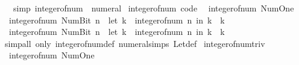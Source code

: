 \begin{isabellebody}
\ \ \ {\isacharbrackleft}{\kern0pt}simp{\isacharbrackright}{\kern0pt}{\isacharcolon}{\kern0pt}\ {\isachardoublequoteopen}integer{\isacharunderscore}{\kern0pt}of{\isacharunderscore}{\kern0pt}num\ {\isacharequal}{\kern0pt}\ numeral{\isachardoublequoteclose}\isanewline
\isanewline
{}\isamarkupfalse%
\ integer{\isacharunderscore}{\kern0pt}of{\isacharunderscore}{\kern0pt}num\ {\isacharbrackleft}{\kern0pt}code{\isacharbrackright}{\kern0pt}{\isacharcolon}{\kern0pt}\isanewline
\ \ {\isachardoublequoteopen}integer{\isacharunderscore}{\kern0pt}of{\isacharunderscore}{\kern0pt}num\ Num{\isachardot}{\kern0pt}One\ {\isacharequal}{\kern0pt}\ {}{\isachardoublequoteclose}\isanewline
\ \ {\isachardoublequoteopen}integer{\isacharunderscore}{\kern0pt}of{\isacharunderscore}{\kern0pt}num\ {\isacharparenleft}{\kern0pt}Num{\isachardot}{\kern0pt}Bit{}\ n{\isacharparenright}{\kern0pt}\ {\isacharequal}{\kern0pt}\ {\isacharparenleft}{\kern0pt}let\ k\ {\isacharequal}{\kern0pt}\ integer{\isacharunderscore}{\kern0pt}of{\isacharunderscore}{\kern0pt}num\ n\ in\ k\ {\isacharplus}{\kern0pt}\ k{\isacharparenright}{\kern0pt}{\isachardoublequoteclose}\isanewline
\ \ {\isachardoublequoteopen}integer{\isacharunderscore}{\kern0pt}of{\isacharunderscore}{\kern0pt}num\ {\isacharparenleft}{\kern0pt}Num{\isachardot}{\kern0pt}Bit{}\ n{\isacharparenright}{\kern0pt}\ {\isacharequal}{\kern0pt}\ {\isacharparenleft}{\kern0pt}let\ k\ {\isacharequal}{\kern0pt}\ integer{\isacharunderscore}{\kern0pt}of{\isacharunderscore}{\kern0pt}num\ n\ in\ k\ {\isacharplus}{\kern0pt}\ k\ {\isacharplus}{\kern0pt}\ {}{\isacharparenright}{\kern0pt}{\isachardoublequoteclose}\isanewline
%
\isadelimproof
\ \ %
\endisadelimproof
%
\isatagproof
{}\isamarkupfalse%
\ {\isacharparenleft}{\kern0pt}simp{\isacharunderscore}{\kern0pt}all\ only{\isacharcolon}{\kern0pt}\ integer{\isacharunderscore}{\kern0pt}of{\isacharunderscore}{\kern0pt}num{\isacharunderscore}{\kern0pt}def\ numeral{\isachardot}{\kern0pt}simps\ Let{\isacharunderscore}{\kern0pt}def{\isacharparenright}{\kern0pt}%
\endisatagproof
{\isafoldproof}%
%
\isadelimproof
\isanewline
%
\endisadelimproof
\isanewline
{}\isamarkupfalse%
\ integer{\isacharunderscore}{\kern0pt}of{\isacharunderscore}{\kern0pt}num{\isacharunderscore}{\kern0pt}triv{\isacharcolon}{\kern0pt}\isanewline
\ \ {\isachardoublequoteopen}integer{\isacharunderscore}{\kern0pt}of{\isacharunderscore}{\kern0pt}num\ Num{\isachardot}{\kern0pt}One\ {\isacharequal}{\kern0pt}\ {}{\isachardoublequoteclose}\isanewline

\end{isabellebody}

